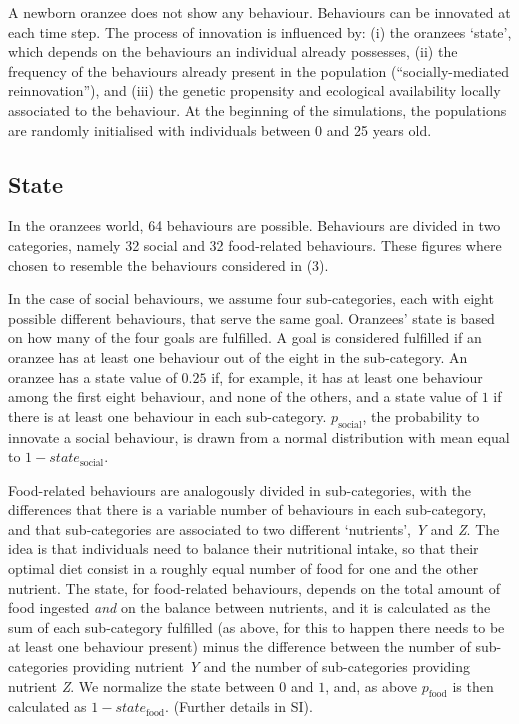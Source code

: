 \documentclass[9pt,twocolumn,twoside,]{pnas-new}
\begin{document}
A newborn oranzee does not show any behaviour. Behaviours can be
innovated at each time step. The process of innovation is influenced by:
(i) the oranzees `state', which depends on the behaviours an individual
already possesses, (ii) the frequency of the behaviours already present
in the population (``socially-mediated reinnovation''), and (iii) the
genetic propensity and ecological availability locally associated to the
behaviour. At the beginning of the simulations, the populations are
randomly initialised with individuals between 0 and 25 years old.

\subsection*{State}\label{format}

In the oranzees world, 64 behaviours are possible. Behaviours are
divided in two categories, namely 32 social and 32 food-related
behaviours. These figures where chosen to resemble the behaviours
considered in (3).

In the case of social behaviours, we assume four sub-categories, each
with eight possible different behaviours, that serve the same goal.
Oranzees' state is based on how many of the four goals are fulfilled. A
goal is considered fulfilled if an oranzee has at least one behaviour
out of the eight in the sub-category. An oranzee has a state value of
\(0.25\) if, for example, it has at least one behaviour among the first
eight behaviour, and none of the others, and a state value of \(1\) if
there is at least one behaviour in each sub-category.
\(p_\text{social}\), the probability to innovate a social behaviour, is
drawn from a normal distribution with mean equal to
\(1-state_\text{social}\).

Food-related behaviours are analogously divided in sub-categories, with
the differences that there is a variable number of behaviours in each
sub-category, and that sub-categories are associated to two different
`nutrients', \emph{Y} and \emph{Z}. The idea is that individuals need to
balance their nutritional intake, so that their optimal diet consist in
a roughly equal number of food for one and the other nutrient. The
state, for food-related behaviours, depends on the total amount of food
ingested \emph{and} on the balance between nutrients, and it is
calculated as the sum of each sub-category fulfilled (as above, for this
to happen there needs to be at least one behaviour present) minus the
difference between the number of sub-categories providing nutrient
\emph{Y} and the number of sub-categories providing nutrient \emph{Z}.
We normalize the state between \(0\) and \(1\), and, as above
\(p_\text{food}\) is then calculated as \(1-state_\text{food}\).
(Further details in SI).
\end{document}

